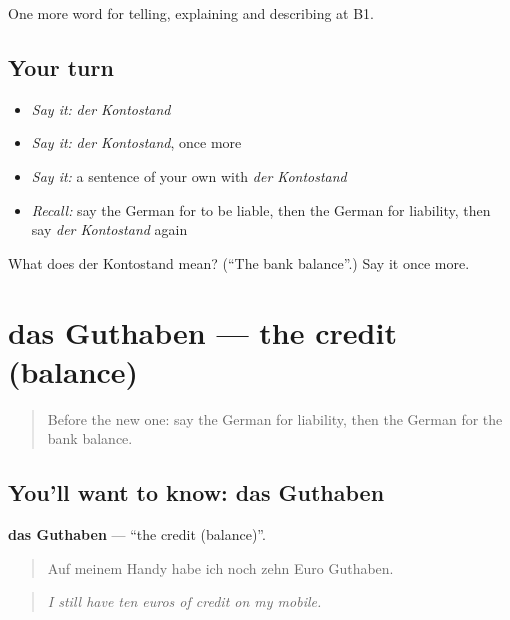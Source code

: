 \begin{grammarlens}[title={What you've built}]
One more word for telling, explaining and describing at B1.
\end{grammarlens}

\subsection*{Your turn}
\begin{itemize}
\raggedright
  \item \emph{Say it:} \emph{der Kontostand}
  \item \emph{Say it:} \emph{der Kontostand}, once more
  \item \emph{Say it:} a sentence of your own with \emph{der Kontostand}
  \item \emph{Recall:} say the German for to be liable, then the German for liability, then say \emph{der Kontostand} again
\end{itemize}

\begin{tcolorbox}[breakable,colback=teal!4,colframe=teal!35!black,title={Before you move on}]
What does der Kontostand mean? (\textquotedblleft{}The bank balance\textquotedblright{}.) Say it once more.
\end{tcolorbox}
\section[das Guthaben]{das Guthaben — the credit (balance)}

\label{lesson:GE-C387-guthaben}



\begin{quote}
Before the new one: say the German for liability, then the German for the bank balance.
\end{quote}

\subsection*{You'll want to know: das Guthaben}
\textbf{das Guthaben} — \textquotedblleft{}the credit (balance)\textquotedblright{}.

\begin{quote}
Auf meinem Handy habe ich noch zehn Euro Guthaben.
\end{quote}

\begin{quote}
\emph{I still have ten euros of credit on my mobile.}
\end{quote}

